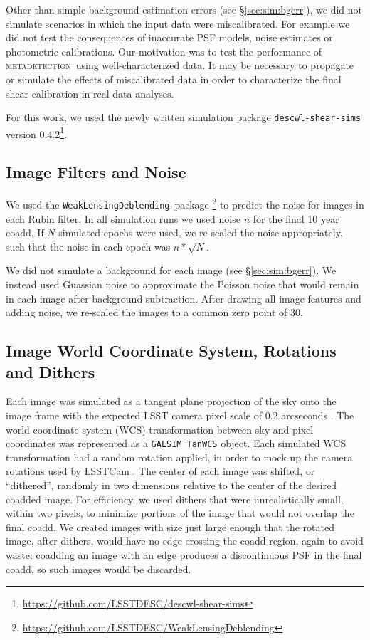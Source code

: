 \documentclass[twocolumn,twocolappendix,astrosym]{openjournal}
\newcommand{\descwl}{\texttt{WeakLensingDeblending}}
\newcommand{\galsim}{\texttt{GALSIM}}
\newcommand{\mdet}{\textsc{metadetection}}
\begin{document}
Other than simple background estimation errors (see \S \ref{sec:sim:bgerr}), we
did not simulate scenarios in which the input data were miscalibrated.  For
example we did not test the consequences of inaccurate PSF models, noise
estimates or photometric calibrations.  Our motivation was to test the
performance of \mdet\ using well-characterized data. It may be necessary to
propagate or simulate the effects of miscalibrated data in order to
characterize the final shear calibration in real data analyses.

For this work, we used the newly written simulation package
\texttt{descwl-shear-sims} version
0.4.2\footnote{\url{https://github.com/LSSTDESC/descwl-shear-sims}}.

\subsection{Image Filters and Noise} \label{sec:sim:noise}

We used the \descwl\ package
\citep{DESCWLSanchez2021}\footnote{\url{https://github.com/LSSTDESC/WeakLensingDeblending}}
to predict the noise for images in each Rubin filter.  In all simulation runs
we used noise $n$ for the final 10 year coadd.  If $N$ simulated epochs were
used, we re-scaled the noise appropriately, such that the noise in each epoch
was $n * \sqrt{N}$.

We did not simulate a background for each image (see \S \ref{sec:sim:bgerr}).
We instead used Guassian noise to approximate the Poisson noise that would
remain in each image after background subtraction.  After drawing all image
features and adding noise, we re-scaled the images to a common zero point of
30.

\subsection{Image World Coordinate System, Rotations and Dithers} \label{sec:sim:rotdith}

Each image was simulated as a tangent plane projection of the sky onto the
image frame with the expected LSST camera pixel scale of 0.2 arcseconds
\citep{IvezicLSST2008}.  The world coordinate system (WCS) transformation between
sky and pixel coordinates was represented as a \galsim\ \texttt{TanWCS} object.
Each simulated WCS transformation had a random rotation applied, in order to
mock up the camera rotations used by LSSTCam \citep{IvezicLSST2008}.  The
center of each image was shifted, or ``dithered'', randomly in two dimensions
relative to the center of the desired coadded image.  For efficiency, we used
dithers that were unrealistically small, within two pixels, to minimize portions of the
image that would not overlap the final coadd.  We created images with size just
large enough that the rotated image, after dithers, would have no edge
crossing the coadd region, again to avoid waste:  coadding an image with an
edge produces a discontinuous PSF in the final coadd, so such images would be
discarded.
\end{document}
